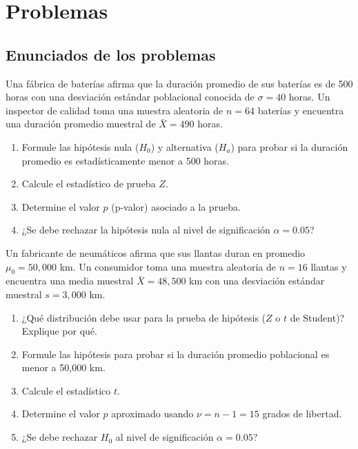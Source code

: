 \section*{Problemas}

\subsection*{Enunciados de los problemas}

\begin{problema}
	\label{prob:c7ea911}
	Una fábrica de baterías afirma que la duración promedio de sus baterías es de 500 horas con una desviación estándar poblacional conocida de $\sigma = 40$ horas. Un inspector de calidad toma una muestra aleatoria de $n = 64$ baterías y encuentra una duración promedio muestral de $\bar{X} = 490$ horas.
	\begin{enumerate}
		\item Formule las hipótesis nula ($H_0$) y alternativa ($H_a$) para probar si la duración promedio es estadísticamente menor a 500 horas.
		\item Calcule el estadístico de prueba $Z$.
		\item Determine el valor $p$ (p-valor) asociado a la prueba.
		\item ¿Se debe rechazar la hipótesis nula al nivel de significación $\alpha = 0.05$?
	\end{enumerate}
\end{problema}

\begin{problema}
	\label{prob:f6ad523}
	Un fabricante de neumáticos afirma que sus llantas duran en promedio $\mu_0 = 50,000$ km. Un consumidor toma una muestra aleatoria de $n = 16$ llantas y encuentra una media muestral $\bar{X} = 48,500$ km con una desviación estándar muestral $s = 3,000$ km.
	\begin{enumerate}
		\item ¿Qué distribución debe usar para la prueba de hipótesis ($Z$ o $t$ de Student)? Explique por qué.
		\item Formule las hipótesis para probar si la duración promedio poblacional es menor a 50,000 km.
		\item Calcule el estadístico $t$.
		\item Determine el valor $p$ aproximado usando $\nu = n-1 = 15$ grados de libertad.
		\item ¿Se debe rechazar $H_0$ al nivel de significación $\alpha = 0.05$?
	\end{enumerate}
\end{problema}

